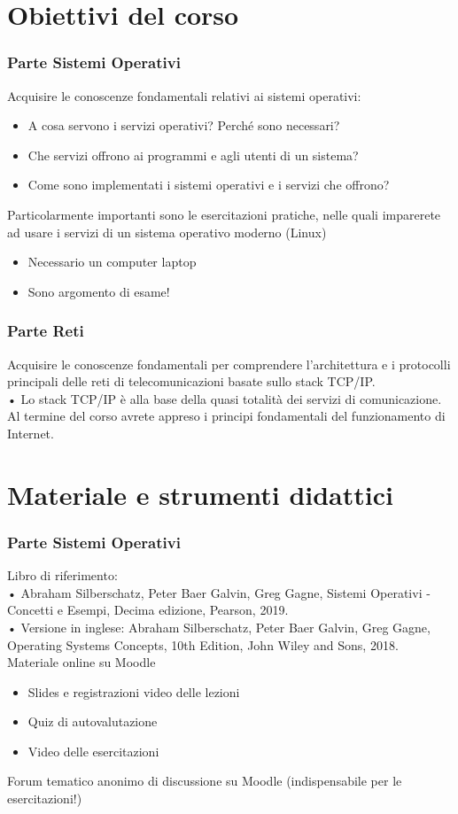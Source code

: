 \section{Obiettivi del corso}
\subsubsection{Parte Sistemi Operativi}
Acquisire le conoscenze fondamentali relativi ai sistemi operativi:
\begin{itemize}
    \item A cosa servono i servizi operativi? Perché sono necessari?
    \item Che servizi offrono ai programmi e agli utenti di un sistema?
    \item Come sono implementati i sistemi operativi e i servizi che offrono?
\end{itemize}
Particolarmente importanti sono le esercitazioni pratiche, nelle quali imparerete ad usare i servizi di un sistema operativo moderno (Linux)
\begin{itemize}
    \item Necessario un computer laptop
    \item Sono argomento di esame!
\end{itemize}

\subsubsection{Parte Reti}
Acquisire le conoscenze fondamentali per comprendere l'architettura e i protocolli principali delle reti di telecomunicazioni basate sullo stack TCP/IP.\\
• Lo stack TCP/IP è alla base della quasi totalità dei servizi di comunicazione.\\
Al termine del corso avrete appreso i principi fondamentali del funzionamento di Internet.

\section{Materiale e strumenti didattici}
\subsubsection{Parte Sistemi Operativi}
Libro di riferimento:\\
 • Abraham Silberschatz, Peter Baer Galvin, Greg Gagne, Sistemi Operativi - Concetti e Esempi, Decima edizione, Pearson, 2019.\\
 • Versione in inglese: Abraham Silberschatz, Peter Baer Galvin, Greg Gagne, Operating Systems Concepts, 10th Edition, John Wiley and Sons, 2018.\\
Materiale online su Moodle
\begin{itemize}
    \item Slides e registrazioni video delle lezioni
    \item Quiz di autovalutazione
    \item Video delle esercitazioni
\end{itemize}
Forum tematico anonimo di discussione su Moodle (indispensabile per le esercitazioni!)

